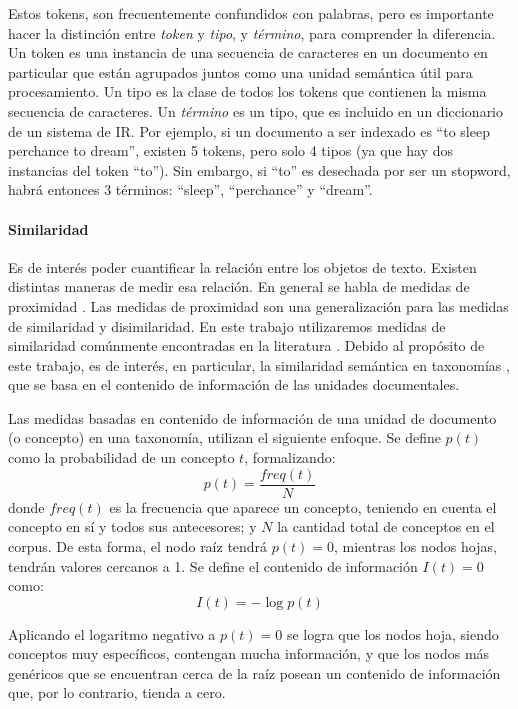 Estos tokens, son frecuentemente confundidos con palabras, pero es importante hacer la distinción entre \textit{token} y \textit{tipo}, y \textit{término}, para comprender la diferencia. Un token es una instancia de una secuencia de caracteres en un documento en particular que están agrupados juntos como una unidad semántica útil para procesamiento. Un tipo es la clase de todos los tokens que contienen la misma secuencia de caracteres. Un \textit{término} es un tipo, que es incluido en un diccionario de un sistema de IR. Por ejemplo, si un documento a ser indexado es “to sleep perchance to dream”, existen 5 tokens, pero solo 4 tipos (ya que hay dos instancias del token “to”). Sin embargo, si “to” es desechada por ser un stopword, habrá entonces 3 términos: “sleep”, “perchance” y “dream”.

\paragraph{Similaridad}\label{paragraph:similaridad}
Es de interés poder cuantificar la relación entre los objetos de texto. Existen distintas maneras de medir esa relación. En general se habla de medidas de proximidad \citep{xu2008clustering}. Las medidas de proximidad son una generalización para las medidas de similaridad y disimilaridad. En este trabajo utilizaremos medidas de similaridad comúnmente encontradas en la literatura \citep{resnik1995using, lin1998information, gomaa2013survey, harispe2015semantic}. Debido al propósito de este trabajo, es de interés, en particular, la similaridad semántica en taxonomías \citep{resnik1995using}, que se basa en el contenido de información de las unidades documentales.

\bigskip Las medidas basadas en contenido de información de una unidad de documento (o concepto) en una taxonomía, utilizan el siguiente enfoque.  Se define \(p(t)\) como la probabilidad de un concepto \(t\), formalizando:
\[p(t)=\frac{freq(t)}{N}\]
donde \(freq(t)\) es la frecuencia que aparece un concepto, teniendo en cuenta el concepto en sí y todos sus antecesores; y \(N\) la cantidad total de conceptos en el corpus. De esta forma, el nodo raíz tendrá \(p(t) = 0\), mientras los nodos hojas, tendrán valores cercanos a 1. Se define el contenido de información \(I(t) = 0\) como:
\[I(t)=-\log p(t)\]

Aplicando el logaritmo negativo a \(p(t) = 0\) se logra que los nodos hoja, siendo conceptos muy específicos, contengan mucha información, y que los nodos más genéricos que se encuentran cerca de la raíz posean un contenido de información que, por lo contrario, tienda a cero.

